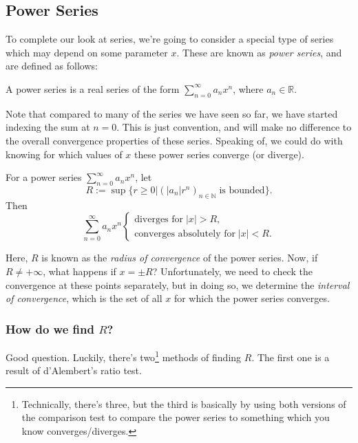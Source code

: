\documentclass[
  10pt,
  a4paper]{article}
\theoremstyle{plain}
\theoremstyle{definition}
\theoremstyle{plain}
\theoremstyle{plain}
\theoremstyle{plain}
\theoremstyle{plain}
\theoremstyle{definition}
\theoremstyle{definition}
\theoremstyle{remark}
\theoremstyle{remark}
\let\BeginKnitrBlock\begin \let\EndKnitrBlock\end
\begin{document}
\hypertarget{power-series}{%
\subsection{Power Series}\label{power-series}}

To complete our look at series, we're going to consider a special type of series which may depend on some parameter \(x\). These are known as \emph{power series}, and are defined as follows:

\BeginKnitrBlock{definition}[Power Series]
{\label{def:def1} }A power series is a real series of the form \(\sum_{n = 0}^{\infty} a_n x^n\), where \(a_n \in \mathbb{R}\).
\EndKnitrBlock{definition}
Note that compared to many of the series we have seen so far, we have started indexing the sum at \(n = 0\). This is just convention, and will make no difference to the overall convergence properties of these series. Speaking of, we could do with knowing for which values of \(x\) these power series converge (or diverge).

\BeginKnitrBlock{proposition}
{\label{prp:prop1} }For a power series \(\sum_{n = 0}^{\infty} a_n x^n\), let \[R:= \sup\lbrace r \geq 0 \lvert \left(\lvert a_n \rvert r^n\right)_{n \in \mathbb{N}} \; \text{is bounded}\rbrace.\] Then \[\sum_{n = 0}^{\infty} a_n x^n \begin{cases}
\text{diverges for}\;\lvert x \rvert > R,\\
\text{converges absolutely for}\; \lvert x \rvert < R. 
\end{cases}\]
\EndKnitrBlock{proposition}
Here, \(R\) is known as the \emph{radius of convergence} of the power series. Now, if \(R \neq +\infty\), what happens if \(x = \pm R\)? Unfortunately, we need to check the convergence at these points separately, but in doing so, we determine the \emph{interval of convergence}, which is the set of all \(x\) for which the power series converges.

\hypertarget{how-do-we-find-r}{%
\subsubsection{\texorpdfstring{How do we find \(R\)?}{How do we find R?}}\label{how-do-we-find-r}}

Good question. Luckily, there's two\footnote{Technically, there's three, but the third is basically by using both versions of the comparison test to compare the power series to something which you know converges/diverges.} methods of finding \(R\). The first one is a result of d'Alembert's ratio test.
\end{document}

